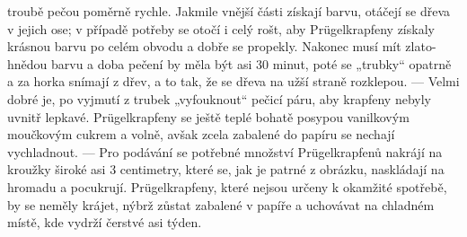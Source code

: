 troubě pečou poměrně rychle. Jakmile vnější části získají barvu, otáčejí
se dřeva v jejich ose; v případě potřeby se otočí i celý rošt, aby
Prügelkrapfeny získaly krásnou barvu po celém obvodu a dobře se
propekly. Nakonec musí mít zlato-hnědou barvu a doba pečení by měla být
asi 30 minut, poté se „trubky`` opatrně a za horka snímají z dřev, a to
tak, že se dřeva na užší straně rozklepou. --- Velmi dobré je, po
vyjmutí z trubek „vyfouknout`` pečicí páru, aby krapfeny nebyly uvnitř
lepkavé. Prügelkrapfeny se ještě teplé bohatě posypou vanilkovým
moučkovým cukrem a volně, avšak zcela zabalené do papíru se nechají
vychladnout. --- Pro podávání se potřebné množství Prügelkrapfenů
nakrájí na kroužky široké asi 3 centimetry, které se, jak je patrné z
obrázku, naskládají na hromadu a pocukrují. Prügelkrapfeny, které nejsou
určeny k okamžité spotřebě, by se neměly krájet, nýbrž zůstat zabalené v
papíře a uchovávat na chladném místě, kde vydrží čerstvé asi týden.

